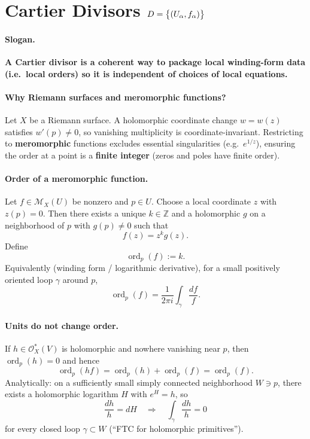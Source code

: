 \documentclass[11pt,openany]{article}
\renewcommand{\emph}[1]{\textbf{#1}}
\newcommand{\ord}{\operatorname{ord}}
\begin{document}
\tableofcontents
\newpage

\section{Cartier Divisors $D=\set{(U_\alpha, f_\alpha)}$}

\paragraph{Slogan.}
\emph{A Cartier divisor is a coherent way to package local winding-form data
	(i.e.\ local orders) so it is independent of choices of local equations.}

\paragraph{Why Riemann surfaces and meromorphic functions?}
Let $X$ be a Riemann surface.
A holomorphic coordinate change $w=w(z)$ satisfies $w'(p)\neq 0$, so
vanishing multiplicity is coordinate-invariant.
Restricting to \emph{meromorphic} functions excludes essential singularities
(e.g.\ $e^{1/z}$), ensuring the order at a point is a \emph{finite integer}
(zeros and poles have finite order).

\paragraph{Order of a meromorphic function.}
Let $f\in \mathcal M_X(U)$ be nonzero and $p\in U$.
Choose a local coordinate $z$ with $z(p)=0$. Then there exists a unique $k\in\mathbb Z$
and a holomorphic $g$ on a neighborhood of $p$ with $g(p)\neq 0$ such that
\[
f(z)=z^k g(z).
\]
Define
\[
\ord_p(f):=k.
\]
Equivalently (winding form / logarithmic derivative), for a small positively oriented
loop $\gamma$ around $p$,
\[
\ord_p(f)=\frac{1}{2\pi i}\int_{\gamma}\frac{df}{f}.
\]

\paragraph{Units do not change order.}
If $h\in \mathcal O_X^*(V)$ is holomorphic and nowhere vanishing near $p$, then
$\ord_p(h)=0$ and hence
\[
\ord_p(hf)=\ord_p(h)+\ord_p(f)=\ord_p(f).
\]
Analytically: on a sufficiently small simply connected neighborhood $W\ni p$,
there exists a holomorphic logarithm $H$ with $e^{H}=h$, so
\[
\frac{dh}{h}=dH
\quad\Rightarrow\quad
\int_{\gamma}\frac{dh}{h}=0
\]
for every closed loop $\gamma\subset W$ (``FTC for holomorphic primitives'').
\end{document}
